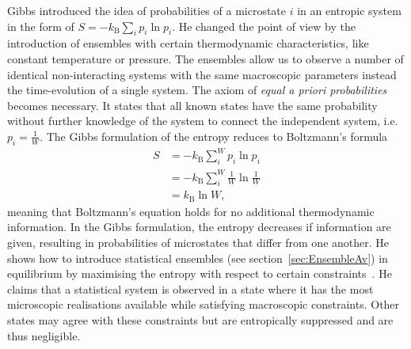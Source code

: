 Gibbs introduced the idea of probabilities of a microstate 
$i$ in an entropic 
system in the form of $S = -k_{\mathrm{B}} \sum_i p_i \ln p_i$. He changed the point of view by the introduction of ensembles with certain thermodynamic characteristics, like constant temperature or pressure. 
The ensembles allow us to observe a number of identical non-interacting systems with the same macroscopic parameters instead the time-evolution of a single system. The axiom of \textit{equal a priori probabilities} becomes necessary. It states that all known states have the same probability without further knowledge of the system to connect the independent system, i.e. $p_i = \frac{1}{W}$. The Gibbs formulation of the entropy reduces to Boltzmann's formula 
\begin{equation}
\begin{aligned}
 S &= -k_{\mathrm{B}} \sum^W_i p_i \ln p_i \\
 & = -k_{\mathrm{B}} \sum^W_i \frac{1}{W} \ln \frac{1}{W} \\
 & =k_{\mathrm{B}} \ln W,
\end{aligned} 
\end{equation}
meaning that Boltzmann's equation holds for no additional thermodynamic information. In the Gibbs formulation, the entropy decreases if information are given,   resulting in probabilities of microstates that differ from one another. He shows how to introduce statistical ensembles (see section~\ref{sec:EnsembleAv}) in equilibrium by maximising the entropy with respect to certain constraints~\cite{gibbs1902elementary}. He claims that a statistical system is observed in a state where it has the most microscopic realisations available while satisfying macroscopic constraints. Other states may agree with these constraints but are entropically suppressed and are thus negligible. 
 
